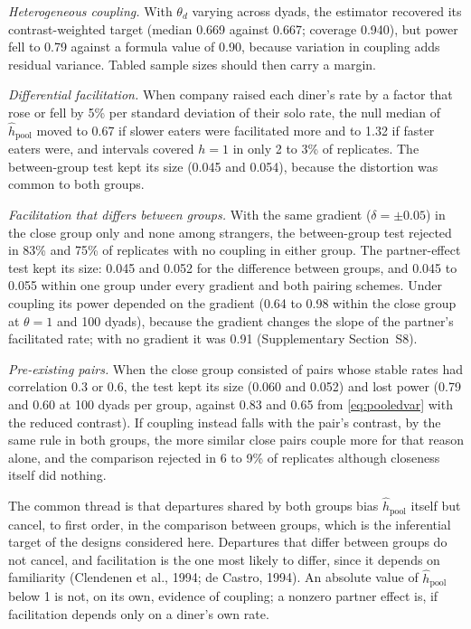 \documentclass[12pt]{article}
\begin{document}
\emph{Heterogeneous coupling.} With $\theta_d$ varying across dyads, the estimator
recovered its contrast-weighted target (median 0.669 against 0.667; coverage
0.940), but power fell to 0.79 against a formula value of 0.90, because variation in
coupling adds residual variance. Tabled sample sizes should then carry a margin.

\emph{Differential facilitation.} When company raised each diner's rate by a factor
that rose or fell by 5\% per standard deviation of their solo rate, the null median
of $\hat h_{\mathrm{pool}}$ moved to 0.67 if slower eaters were facilitated more and
to 1.32 if faster eaters were, and intervals covered $h=1$ in only 2 to 3\%
of replicates. The between-group test kept its size (0.045 and 0.054), because the
distortion was common to both groups.

\emph{Facilitation that differs between groups.} With the same gradient
($\delta=\pm0.05$) in the close group only and none among strangers, the
between-group test rejected in 83\% and 75\% of replicates with no coupling in
either group. The partner-effect test kept its size: 0.045 and 0.052 for the
difference between groups, and 0.045 to 0.055 within one group under every
gradient and both pairing schemes. Under coupling its power depended on the
gradient (0.64 to 0.98 within the close group at $\theta=1$ and 100 dyads),
because the gradient changes the slope of the partner's facilitated rate; with no
gradient it was 0.91 (Supplementary Section~S8).

\emph{Pre-existing pairs.} When the close group consisted of pairs whose stable
rates had correlation 0.3 or 0.6, the test kept its size (0.060 and 0.052) and
lost power (0.79 and 0.60 at 100 dyads per group, against 0.83 and 0.65 from
\eqref{eq:pooledvar} with the reduced contrast). If coupling instead falls with the
pair's contrast, by the same rule in both groups, the more similar close pairs
couple more for that reason alone, and the comparison rejected in 6 to 9\% of
replicates although closeness itself did nothing.

The common thread is that departures shared by both groups bias
$\hat h_{\mathrm{pool}}$ itself but cancel, to first order, in the comparison
between groups, which is the inferential target of the designs considered here.
Departures that differ between groups do not cancel, and facilitation is the one
most likely to differ, since it depends on familiarity (Clendenen et al., 1994;
de Castro, 1994). An absolute value of $\hat h_{\mathrm{pool}}$ below 1 is not, on
its own, evidence of coupling; a nonzero partner effect is, if facilitation depends
only on a diner's own rate.
\end{document}
